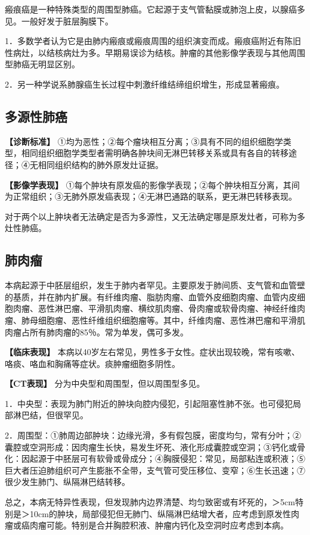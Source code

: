 瘢痕癌是一种特殊类型的周围型肺癌。它起源于支气管黏膜或肺泡上皮，以腺癌多见。一般好发于脏层胸膜下。

1．多数学者认为它是由肺内瘢痕或瘢痕周围的组织演变而成。瘢痕癌附近有陈旧性病灶，以结核病灶为多。早期易误诊为结核。肿瘤的其他影像学表现与其他周围型肺癌无明显区别。

2．另一种学说系肺腺癌生长过程中刺激纤维结缔组织增生，形成显著瘢痕。

\subsection{多源性肺癌}

\textbf{【诊断标准】}
①均为恶性；②每个瘤块相互分离；③具有不同的组织细胞学类型，相同组织细胞学类型者需明确各肿块间无淋巴转移关系或具有各自的转移途径；④无相同组织结构的肺外原发灶证据。

\textbf{【影像学表现】}
①每个肿块有原发癌的影像学表现；②每个肿块相互分离，其间为正常组织；③无肺外原发癌表现；④无淋巴通路的联系，更无淋巴转移表现。

对于两个以上肿块者无法确定是否为多源性，又无法确定哪是原发灶者，可称为多灶性肺癌。

\subsection{肺肉瘤}

本病起源于中胚层组织，发生于肺内者罕见。主要原发于肺间质、支气管和血管壁的基质，并在肺内扩展。有纤维肉瘤、脂肪肉瘤、血管外皮细胞肉瘤、血管内皮细胞肉瘤、恶性淋巴瘤、平滑肌肉瘤、横纹肌肉瘤、骨肉瘤或软骨肉瘤、神经纤维肉瘤、肺母细胞瘤、恶性纤维组织细胞瘤等。其中，纤维肉瘤、恶性淋巴瘤和平滑肌肉瘤占所有肺肉瘤的85％。常为单发，偶可多发。

\textbf{【临床表现】}
本病以40岁左右常见，男性多于女性。症状出现较晚，常有咳嗽、咯痰、咯血和胸痛等症状。痰肿瘤细胞多阴性。

\textbf{【CT表现】} 分为中央型和周围型，但以周围型多见。

1．中央型：表现为肺门附近的肿块向腔内侵犯，引起阻塞性肺不张。也可侵犯局部淋巴结，但很罕见。

2．周围型：①肺周边部肿块：边缘光滑，多有假包膜，密度均匀，常有分叶；②囊腔或空洞形成：因肉瘤生长快，易发生坏死、液化形成囊腔或空洞；③钙化或骨化：因起源于中胚层可有软骨或骨成分；④胸膜侵犯：常见，局部粘连或积液；⑤巨大者压迫肺组织可产生膨胀不全带，支气管可受压移位、变窄；⑥生长迅速；⑦很少发生肺门、纵隔淋巴结转移。

总之，本病无特异性表现，但发现肺内边界清楚、均匀致密或有坏死的，＞5cm特别是＞10cm的肿块，局部侵犯但无肺门、纵隔淋巴结增大者，应考虑到原发性肉瘤或癌肉瘤可能。特别是合并胸腔积液、肿瘤内钙化及空洞时应考虑到本病。

